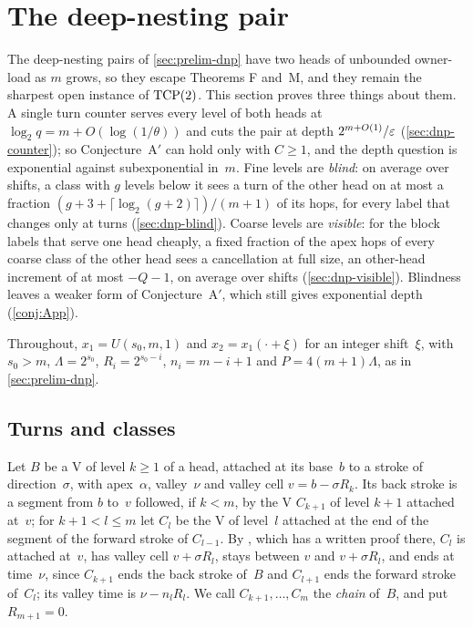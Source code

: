 \section{The deep-nesting pair}\label{sec:dnp}

The deep-nesting pairs of \cref{sec:prelim-dnp} have two heads of unbounded owner-load as $m$ grows, so they escape
Theorems F and~M, and they remain the sharpest open instance of $\mathrm{TCP}(2)$. This section proves three things about them.
A single turn counter serves every level of both heads at $\log_2q=m+O(\log(1/\theta))$ and cuts the pair at depth
$2^{m+O(1)}/\varepsilon$ (\cref{sec:dnp-counter}); so Conjecture~A$'$ can hold only with $C\ge1$, and the depth question is
exponential against subexponential in~$m$. Fine levels are \emph{blind}: on average over shifts, a class with $g$ levels
below it sees a turn of the other head on at most a fraction $(g+3+\lceil\log_2(g+2)\rceil)/(m+1)$ of its hops, for every
label that changes only at turns (\cref{sec:dnp-blind}). Coarse levels are \emph{visible}: for the block labels that serve one head
cheaply, a fixed fraction of the apex hops of every coarse class of the other head sees a cancellation at full size, an
other-head increment of at most $-Q-1$, on average over shifts (\cref{sec:dnp-visible}). Blindness leaves a weaker form of Conjecture~A$'$, which still gives
exponential depth (\cref{conj:App}).

Throughout, $x_1=U(s_0,m,1)$ and $x_2=x_1(\cdot+\xi)$ for an integer shift~$\xi$, with $s_0>m$, $\Lambda=2^{s_0}$,
$R_i=2^{s_0-i}$, $n_i=m-i+1$ and $P=4(m+1)\Lambda$, as in \cref{sec:prelim-dnp}.

\subsection{Turns and classes}\label{sec:dnp-classes}

Let $B$ be a V of level $k\ge1$ of a head, attached at its base~$b$ to a stroke of direction~$\sigma$, with apex~$\alpha$,
valley~$\nu$ and valley cell $v=b-\sigma R_k$. Its back stroke is a segment from $b$ to~$v$ followed, if $k<m$, by the V
$C_{k+1}$ of level $k+1$ attached at~$v$; for $k+1<l\le m$ let $C_l$ be the V of level~$l$ attached at the end of the segment
of the forward stroke of $C_{l-1}$. By \cite[Lemma~5.4(a)]{FourthPaper2026}, which has a written proof there, $C_l$ is attached at~$v$, has valley cell
$v+\sigma R_l$, stays between $v$ and $v+\sigma R_l$, and ends at time~$\nu$, since $C_{k+1}$ ends the back stroke of~$B$ and
$C_{l+1}$ ends the forward stroke of~$C_l$; its valley time is $\nu-n_lR_l$. We call $C_{k+1},\dots,C_m$ the \emph{chain}
of~$B$, and put $R_{m+1}=0$.

